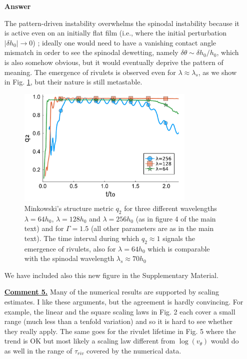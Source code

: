 \documentclass[12pt,english]{article}
\begin{document}
\begin{itemize}
\item[ \textbf{{Answer}}]
{
The pattern-driven instability overwhelms the spinodal instability because it is active even on an initially flat film 
(i.e., where the initial perturbation $|\delta h_0| \rightarrow 0$) 
\cite{KonnurPRL2000,KarguptaLangmuir2000,KarguptaPRL2001}; ideally one would need to have a vanishing 
contact angle mismatch in order to see the spinodal dewetting, namely $\delta \theta \sim \delta h_0/h_0$,
which is also somehow obvious, but it would eventually deprive the pattern of meaning. 
The emergence of rivulets is observed even for $\lambda \approx \lambda_s$, as we show 
in Fig. \ref{fig:q2_difflambda}, but their nature is still metastable. 
\begin{figure}
    \centering
    \includegraphics[width=0.8\textwidth]{lam_256-128-64-51.pdf}
    \caption{Minkowski's structure metric $q_2$ for three different wavelengths $\lambda=64 h_0$, $\lambda=128 h_0$ and $\lambda=256 h_0$ (as in figure 4 of the main text) and for $\Gamma=1.5$ (all other parameters are as in the main text). The time interval during which $q_2 \approx 1$ signals the emergence of rivulets, also for 
    $\lambda = 64 h_0$ which is comparable with the spinodal wavelength $\lambda_s \approx 70 h_0$}
    \label{fig:q2_difflambda}
\end{figure}
We have included also this new figure in the Supplementary Material.
}

\item[ \textbf{\underline{Comment 5.}}]
{ 
Many of the numerical results are supported by scaling estimates. I
like these arguments, but the agreement is hardly convincing. For
example, the linear and the square scaling laws in Fig. 2 each cover a
small range (much less than a tenfold variation) and so it is hard to
see whether they really apply. 
The same goes for the rivulet lifetime in Fig. 5 where the trend is OK but most likely a scaling law different from $\log(v_{\theta})$ would do as well in the range of $\tau_{riv}$ covered by the numerical data.
}


\end{itemize}
\end{document}
